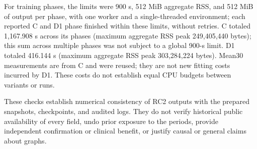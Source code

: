 For training phases, the limits were 900 s, 512 MiB aggregate RSS, and 512 MiB of output per phase, with one worker and a single-threaded environment; each reported C and D1 phase finished within these limits, without retries. C totaled 1,167.908 s across its phases (maximum aggregate RSS peak 249,405,440 bytes); this sum across multiple phases was not subject to a global 900-s limit. D1 totaled 416.144 s (maximum aggregate RSS peak 303,284,224 bytes). Mean30 measurements are from C and were reused; they are not new fitting costs incurred by D1. These costs do not establish equal CPU budgets between variants or runs.

These checks establish numerical consistency of RC2 outputs with the prepared snapshots, checkpoints, and audited logs. They do not verify historical public availability of every field, undo prior exposure to the periods, provide independent confirmation or clinical benefit, or justify causal or general claims about graphs.